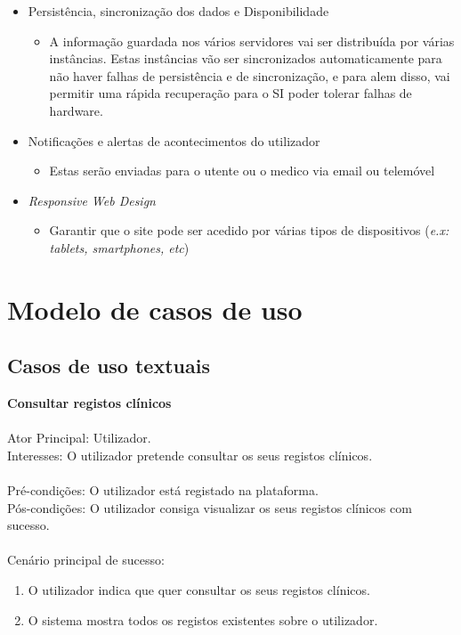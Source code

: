 \documentclass[12pt, a4paper, twoside]{report} %
\begin{document}
\begin{itemize}
\begin{itemize}
	\end{itemize}
\item Persistência, sincronização dos dados e Disponibilidade
	\begin{itemize}
	\item A informação guardada nos vários servidores vai ser distribuída por várias instâncias. Estas instâncias vão ser sincronizados automaticamente para não haver falhas de persistência e de sincronização, e para alem disso, vai permitir uma rápida recuperação para o SI poder tolerar falhas de hardware.
	\end{itemize}
\item Notificações e alertas de acontecimentos do utilizador
\begin{itemize}
\item Estas serão enviadas para o utente ou o medico via email ou telemóvel
\end{itemize}
\item \textit {Responsive Web Design}
\begin{itemize}
\item Garantir que o site pode ser acedido por várias tipos de dispositivos (\textit{e.x: tablets, smartphones, etc})
\end{itemize}
\end{itemize}

\clearpage


\section{Modelo de casos de uso}

\subsection{Casos de uso textuais}

\textbf{Consultar registos clínicos}
\\
\\
Ator Principal: Utilizador.\\
Interesses: O utilizador pretende consultar os seus registos clínicos.\\
\\
Pré-condições: O utilizador está registado na plataforma.\\
Pós-condições: O utilizador consiga visualizar os seus registos clínicos com sucesso.\\
\\
Cenário principal de sucesso: 
	\begin{enumerate}
	\item O utilizador indica que quer consultar os seus registos clínicos.
	\item O sistema mostra todos os registos existentes sobre o utilizador.
	\end{enumerate}
\end{document}
